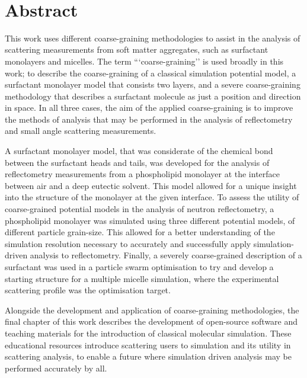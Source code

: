 \documentclass[twoside,symmetric,nobib]{./arm-thesis}
\newcommand{\blankpage}{\newpage\hbox{}\thispagestyle{empty}\newpage}
\begin{document}
\blankpage

\newpage

\begin{fullwidth}
\thispagestyle{empty}
\setlength{\parindent}{0pt}
\setlength{\parskip}{\baselineskip}
~\vfill
\chapter*{Abstract}
This work uses different coarse-graining methodologies to assist in the analysis of scattering measurements from soft matter aggregates, such as surfactant monolayers and micelles.
The term ```coarse-graining'' is used broadly in this work; to describe the coarse-graining of a classical simulation potential model, a surfactant monolayer model that consists two layers, and a severe coarse-graining methodology that describes a surfactant molecule as just a position and direction in space.
In all three cases, the aim of the applied coarse-graining is to improve the methods of analysis that may be performed in the analysis of reflectometry and small angle scattering measurements.

A surfactant monolayer model, that was considerate of the chemical bond between the surfactant heads and tails, was developed for the analysis of reflectometry measurements from a phospholipid monolayer at the interface between air and a deep eutectic solvent.
This model allowed for a unique insight into the structure of the monolayer at the given interface.
To assess the utility of coarse-grained potential models in the analysis of neutron reflectometry, a phospholipid monolayer was simulated using three different potential models, of different particle grain-size.
This allowed for a better understanding of the simulation resolution necessary to accurately and successfully apply simulation-driven analysis to reflectometry.
Finally, a severely coarse-grained description of a surfactant was used in a particle swarm optimisation to try and develop a starting structure for a multiple micelle simulation, where the experimental scattering profile was the optimisation target.

Alongside the development and application of coarse-graining methodologies, the final chapter of this work describes the development of open-source software and teaching materials for the introduction of classical molecular simulation.
These educational resources introduce scattering users to simulation and its utility in scattering analysis, to enable a future where simulation driven analysis may be performed accurately by all.
~\vfill
\end{fullwidth}
\end{document}
